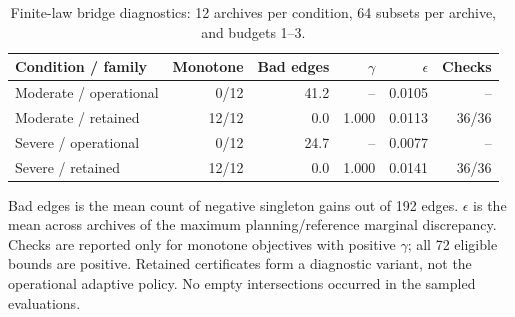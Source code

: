 \begin{table}[htbp]
\centering\small
\setlength{\tabcolsep}{4pt}
\caption{Finite-law bridge diagnostics: 12 archives per condition, 64 subsets per archive, and budgets 1--3.}
\label{tab:ext-bridge}
\begin{tabular}{lrrrrr}
\toprule
Condition / family & Monotone & Bad edges & $\gamma$ & $\epsilon$ & Checks \\
\midrule
Moderate / operational & 0/12 & 41.2 & -- & 0.0105 & -- \\
Moderate / retained & 12/12 & 0.0 & 1.000 & 0.0113 & 36/36 \\
Severe / operational & 0/12 & 24.7 & -- & 0.0077 & -- \\
Severe / retained & 12/12 & 0.0 & 1.000 & 0.0141 & 36/36 \\
\bottomrule
\end{tabular}
\par\smallskip\begin{minipage}{0.97\linewidth}\footnotesize Bad edges is the mean count of negative singleton gains out of 192 edges. $\epsilon$ is the mean across archives of the maximum planning/reference marginal discrepancy. Checks are reported only for monotone objectives with positive $\gamma$; all 72 eligible bounds are positive. Retained certificates form a diagnostic variant, not the operational adaptive policy. No empty intersections occurred in the sampled evaluations.\end{minipage}
\end{table}
